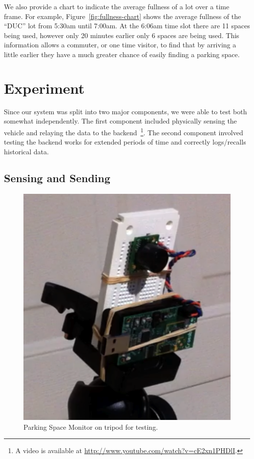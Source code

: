 \documentclass{acm_proc}
\begin{document}
We also provide a chart to indicate the average fullness of a lot over a
time frame.
For example, Figure~\ref{fig:fullness-chart} shows the average fullness of
the ``DUC'' lot from 5:30am until 7:00am.
At the 6:06am time slot there are 11 spaces being used, however only 20
minutes earlier only 6 spaces are being used.
This information allows a commuter, or one time visitor, to find that by
arriving a little earlier they have a much greater chance of easily finding
a parking space.

\section{Experiment}\label{sec:experiment}

Since our system was split into two major components, we were able to test
both somewhat independently. 
The first component included physically sensing the vehicle and relaying
the data to the backend~\footnote{A video is available at
\url{http://www.youtube.com/watch?v=cE2xn1PHDlI}.}.
The second component involved testing the backend works for extended
periods of time and correctly logs/recalls historical data.

\subsection{Sensing and Sending}

\begin{figure}
    \begin{center}
		\includegraphics[width=\columnwidth]{figures/parking_sensor}
	\end{center}
	\caption{Parking Space Monitor on tripod for testing.}
	\label{fig:parking_sensor}
\end{figure}
\end{document}
